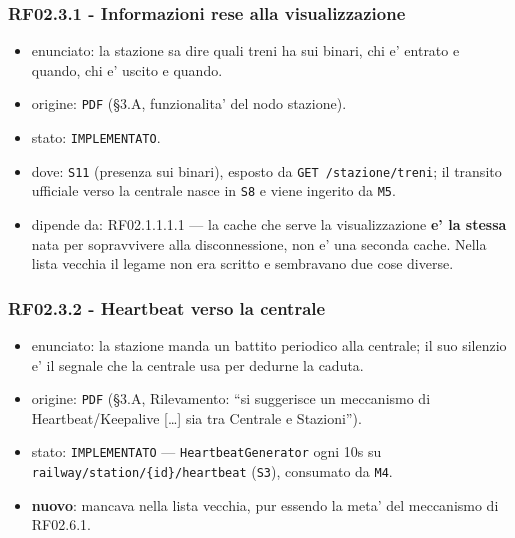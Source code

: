 \documentclass[11pt]{article}
\begin{document}
\subsubsection{RF02.3.1 - Informazioni rese alla visualizzazione}
\label{sec:org649320c}
\begin{itemize}
\item enunciato: la stazione sa dire quali treni ha sui binari, chi e' entrato e quando, chi e' uscito e
quando.
\item origine: \texttt{PDF} (§3.A, funzionalita' del nodo stazione).
\item stato: \texttt{IMPLEMENTATO}.
\item dove: \texttt{S11} (presenza sui binari), esposto da \texttt{GET /stazione/treni}; il transito ufficiale verso
la centrale nasce in \texttt{S8} e viene ingerito da \texttt{M5}.
\item dipende da: RF02.1.1.1.1 — la cache che serve la visualizzazione \textbf{e' la stessa} nata per
sopravvivere alla disconnessione, non e' una seconda cache. Nella lista vecchia il legame non era
scritto e sembravano due cose diverse.
\end{itemize}
\subsubsection{RF02.3.2 - Heartbeat verso la centrale}
\label{sec:org073b952}
\begin{itemize}
\item enunciato: la stazione manda un battito periodico alla centrale; il suo silenzio e' il segnale che
la centrale usa per dedurne la caduta.
\item origine: \texttt{PDF} (§3.A, Rilevamento: ``si suggerisce un meccanismo di Heartbeat/Keepalive [\ldots{}] sia
tra Centrale e Stazioni'').
\item stato: \texttt{IMPLEMENTATO} — \texttt{HeartbeatGenerator} ogni 10s su \texttt{railway/station/\{id\}/heartbeat} (\texttt{S3}),
consumato da \texttt{M4}.
\item \textbf{nuovo}: mancava nella lista vecchia, pur essendo la meta' del meccanismo di RF02.6.1.
\end{itemize}
\end{document}
